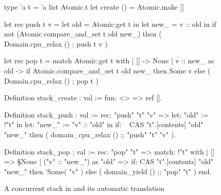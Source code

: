 \begin{figure}[htp]
\begin{minipage}[t]{0.42\textwidth}
\begin{ocamlcode}
type 'a t = 'a list Atomic.t
let create () = Atomic.make []

let rec push t v =
  let old = Atomic.get t in
  let new_ = v :: old in
  if not (Atomic.compare_and_set
            t old new_)
  then (
    Domain.cpu_relax () ;
    push t v
  )

let rec pop t =
  match Atomic.get t with
  | [] -> None
  | v :: new_ as old ->
      if Atomic.compare_and_set
           t old new_
      then Some v
      else (
        Domain.cpu_relax () ;
        pop t
      )
\end{ocamlcode}
\end{minipage}
\begin{minipage}[t]{0.49\textwidth}
\begin{coqcode}
Definition stack_create : val :=
  fun: <> => ref [].

Definition stack_push : val :=
  rec: "push" "t" "v" =>
    let: "old" := !"t" in
    let: "new_" := "v" :: "old" in
    if: ~ CAS "t".[contents] "old" "new_"
    then (
      domain_cpu_relax () ;;
      "push" "t" "v"
    ).

Definition stack_pop : val :=
  rec: "pop" "t" =>
    match: !"t" with
    | [] => §None
    | ("v" :: "new_") as "old" =>
        if: CAS "t".[contents] "old" "new_"
        then ‘Some( "v" )
        else (
          domain_yield () ;;
          "pop" "t"
        )
    end.

\end{coqcode}
\end{minipage}

\caption{A concurrent stack in \OCaml and its automatic \ZooLang translation}
\label{fig:stack}
\end{figure}

